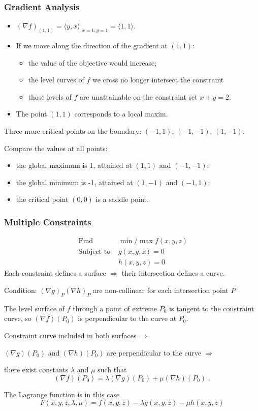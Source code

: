 \begin{frame}
    \frametitle{Gradient Analysis}

    \begin{itemize}
      \item \pause $(\nabla f)_{(1,1)} = \langle y, x \rangle|_{x=1,y=1} = \langle 1,1\rangle$.
      \item \pause If we move along the direction of the gradient at $(1,1)$:
      \begin{itemize}
        \item the value of the objective would increase;
        \item the level curves of $f$ we cross no longer intersect the constraint
        \item those levels of $f$ are unattainable on the constraint set $x+y=2$.
      \end{itemize}
      \item \pause The point $(1,1)$ corresponds to a local maxim.
    \end{itemize}

\pause
Three more critical points on the boundary: $(-1,1)$, $(-1,-1)$, $(1,-1)$.

\pause
Compare the values at all points:
\begin{itemize}
  \item the global maximum is 1, attained at $(1,1)$ and $(-1,-1)$;
  \item the global minimum is -1, attained at $(1,-1)$ and $(-1,1)$;
  \item the critical point $(0,0)$ is a saddle point.
\end{itemize}

\end{frame}

\begin{frame}
  \frametitle{Multiple Constraints}

\begin{align*}
  \text{ Find } & \min/\max f(x,y,z) \\
  \text{ Subject to } & g(x,y,z) = 0 \\
                      & h(x,y,z) = 0
\end{align*}
%
\pause
Each constraint defines a surface $\Longrightarrow$ their intersection defines a curve.

\pause
Condition: $(\nabla g)_P$$(\nabla h)_P$ are non-collinear for each intersection point $P$

The level surface of $f$ through a point of extreme $P_0$ is tangent to the constraint curve, so $(\nabla f)(P_0)$ is perpendicular to the curve at $P_0$.

Constraint curve included in both surfaces $\Longrightarrow$

$(\nabla g)(P_0)$ and $(\nabla h)(P_0)$ are perpendicular to the curve $\Longrightarrow$

\pause
there exist constants $\lambda$ and $\mu$ such that
%
$$(\nabla f)(P_0) = \lambda (\nabla g)(P_0) + \mu (\nabla h)(P_0)\; .$$

\pause
The Lagrange function is in this case
%
$$F(x,y,z,\lambda,\mu) = f(x,y,z) - \lambda g(x,y,z) - \mu h(x,y,z)$$

\end{frame}

